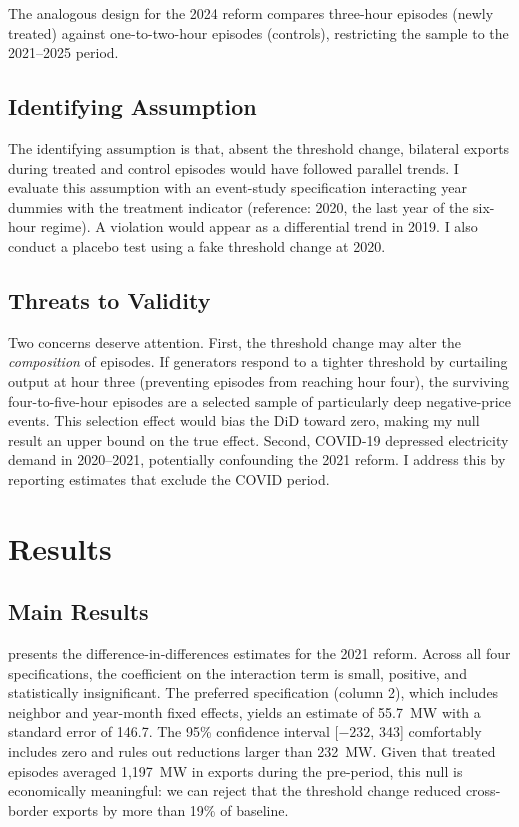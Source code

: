 \documentclass[12pt]{article}
\begin{document}
The analogous design for the 2024 reform compares three-hour episodes (newly treated) against one-to-two-hour episodes (controls), restricting the sample to the 2021--2025 period.

\subsection{Identifying Assumption}

The identifying assumption is that, absent the threshold change, bilateral exports during treated and control episodes would have followed parallel trends. I evaluate this assumption with an event-study specification interacting year dummies with the treatment indicator (reference: 2020, the last year of the six-hour regime). A violation would appear as a differential trend in 2019. I also conduct a placebo test using a fake threshold change at 2020.

\subsection{Threats to Validity}

Two concerns deserve attention. First, the threshold change may alter the \textit{composition} of episodes. If generators respond to a tighter threshold by curtailing output at hour three (preventing episodes from reaching hour four), the surviving four-to-five-hour episodes are a selected sample of particularly deep negative-price events. This selection effect would bias the DiD toward zero, making my null result an upper bound on the true effect. Second, COVID-19 depressed electricity demand in 2020--2021, potentially confounding the 2021 reform. I address this by reporting estimates that exclude the COVID period.

\section{Results}
\label{sec:results}

\subsection{Main Results}



 presents the difference-in-differences estimates for the 2021 reform. Across all four specifications, the coefficient on the interaction term is small, positive, and statistically insignificant. The preferred specification (column 2), which includes neighbor and year-month fixed effects, yields an estimate of 55.7~MW with a standard error of 146.7. The 95\% confidence interval [$-232$, 343] comfortably includes zero and rules out reductions larger than 232~MW. Given that treated episodes averaged 1,197~MW in exports during the pre-period, this null is economically meaningful: we can reject that the threshold change reduced cross-border exports by more than 19\% of baseline.
\end{document}

